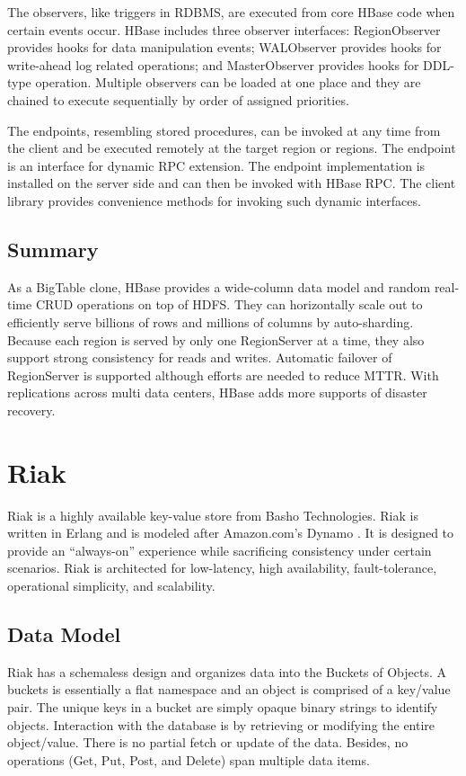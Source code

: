 \documentclass[11pt]{book}
\begin{document}
The observers, like triggers in RDBMS, are executed from core HBase code when certain events occur. HBase includes three observer interfaces: RegionObserver provides hooks for data manipulation events; WALObserver provides hooks for write-ahead log related operations; and MasterObserver provides hooks for DDL-type operation. Multiple observers can be loaded at one place and they are chained to execute sequentially by order of assigned priorities.

The endpoints, resembling stored procedures, can be invoked at any time from the client and be executed remotely at the target region or regions. The endpoint is an interface for dynamic RPC extension. The endpoint implementation is installed on the server side and can then be invoked with HBase RPC. The client library provides convenience methods for invoking such dynamic interfaces.

\subsection{Summary}
As a BigTable clone, HBase provides a wide-column data model and random real-time CRUD operations on top of HDFS. They can horizontally scale out to efficiently serve billions of rows and millions of columns by auto-sharding. Because each region is served by only one RegionServer at a time, they also support strong consistency for reads and writes. Automatic failover of RegionServer is supported although efforts are needed to reduce MTTR. With replications across multi data centers, HBase adds more supports of disaster recovery.

\section[Riak]
{Riak}
Riak \cite{Riak} is a highly available key-value store from Basho Technologies. Riak is written in Erlang and is modeled after Amazon.com's Dynamo \cite{DeCandia:2007:DAH}. It is designed to provide an ``always-on'' experience while sacrificing consistency under certain scenarios. Riak is architected for low-latency, high availability, fault-tolerance, operational simplicity, and scalability.

\subsection{Data Model}

Riak has a schemaless design and organizes data into the Buckets of Objects. A buckets is essentially a flat namespace and an object is comprised of a key/value pair. The unique keys in a bucket are simply opaque binary strings to identify objects. Interaction with the database is by retrieving or modifying the entire object/value. There is no partial fetch or update of the data. Besides, no operations (Get, Put, Post, and Delete) span multiple data items.
\end{document}
